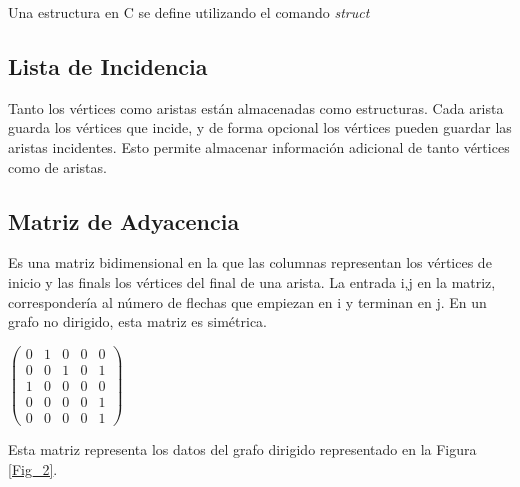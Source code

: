 \documentclass[11pt]{article}
\theoremstyle{plain}
\begin{document}
            Una estructura en C se define utilizando el comando \textit{struct}
        \subsection{Lista de Incidencia} %
        \label{sub:lista_de_incidencia}
            Tanto los vértices como aristas están almacenadas como estructuras. Cada arista guarda los vértices que incide, y de forma opcional los vértices pueden guardar las aristas incidentes. Esto permite almacenar información adicional de tanto vértices como de aristas.
        \subsection{Matriz de Adyacencia} %
        \label{sub:matriz_de_adyacencia}
            Es una matriz bidimensional en la que las columnas representan los vértices de inicio y las finals los vértices del final de una arista. La entrada i,j en la matriz, correspondería al número de flechas que empiezan en i y terminan en j. En un grafo no dirigido, esta matriz es simétrica.\\

            \begin{center}
                $\begin{pmatrix} 
                    0 & 1 & 0 & 0 & 0\\
                    0 & 0 & 1 & 0 & 1\\
                    1 & 0 & 0 & 0 & 0\\
                    0 & 0 & 0 & 0 & 1\\
                    0 & 0 & 0 & 0 & 1    
                \end{pmatrix}$ 
            \end{center}
            Esta matriz representa los datos del grafo dirigido representado en la Figura \ref{Fig_2}.
\end{document}
